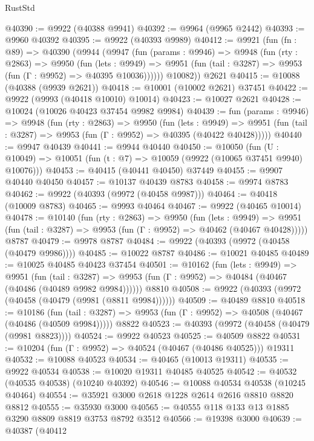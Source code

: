 \begin{lexlean}{RustStd}
\begin{coremodule}
@40390 := @9922 (@40388 @9941)
@40392 := @9964 (@9965 @2442)
@40393 := @9960 @40392
@40395 := @9922 (@40393 @9989)
@40412 := @9921
    (fun (fn : @89) =>
    @40390
      (@9944
        (@9947
          (fun (params : @9946) =>
          @9948
            (fun (rty : @2863) =>
            @9950
              (fun (lets : @9949) =>
              @9951 (fun (tail : @3287) => @9953 (fun (Γ : @9952) => @40395 @10036))))))
        @10082))
    @2621
@40415 := @10088 (@40388 (@9939 @2621))
@40418 := @10001 (@10002 @2621) @37451
@40422 := @9922 (@9993 (@40418 @10010) @10014)
@40423 := @10027 @2621
@40428 := @10024 (@10026 @40423 @37454 @9982 @9984)
@40439 := fun (params : @9946) =>
  @9948
    (fun (rty : @2863) =>
    @9950
      (fun (lets : @9949) =>
      @9951 (fun (tail : @3287) => @9953 (fun (Γ : @9952) => @40395 (@40422 @40428)))))
@40440 := @9947 @40439
@40441 := @9944 @40440
@40450 := @10050
    (fun (U : @10049) => @10051 (fun (t : @7) => @10059 (@9922 (@10065 @37451 @9940) @10076)))
@40453 := @40415 (@40441 @40450) @37449
@40455 := @9907 @40440 @40450
@40457 := @10137 @40439 @8783
@40458 := @9974 @8783
@40462 := @9922 (@40393 (@9972 (@40458 @9987)))
@40464 := @40418 (@10009 @8783)
@40465 := @9993 @40464
@40467 := @9922 (@40465 @10014)
@40478 := @10140
    (fun (rty : @2863) =>
    @9950
      (fun (lets : @9949) =>
      @9951 (fun (tail : @3287) => @9953 (fun (Γ : @9952) => @40462 (@40467 @40428)))))
    @8787
@40479 := @9978 @8787
@40484 := @9922 (@40393 (@9972 (@40458 (@40479 @9986))))
@40485 := @10022 @8787
@40486 := @10021 @40485
@40489 := @10025 @40485 @40423 @37454
@40501 := @10162
    (fun (lets : @9949) =>
    @9951
      (fun (tail : @3287) =>
      @9953 (fun (Γ : @9952) => @40484 (@40467 (@40486 (@40489 @9982 @9984))))))
    @8810
@40508 := @9922 (@40393 (@9972 (@40458 (@40479 (@9981 (@8811 @9984))))))
@40509 := @40489 @8810
@40518 := @10186
    (fun (tail : @3287) => @9953 (fun (Γ : @9952) => @40508 (@40467 (@40486 (@40509 @9984)))))
    @8822
@40523 := @40393 (@9972 (@40458 (@40479 (@9981 @8823))))
@40524 := @9922 @40523
@40525 := @40509 @8822
@40531 := @10204 (fun (Γ : @9952) => @40524 (@40467 (@40486 @40525))) @19311
@40532 := @10088 @40523
@40534 := @40465 (@10013 @19311)
@40535 := @9922 @40534
@40538 := @10020 @19311 @40485 @40525
@40542 := @40532 (@40535 @40538) (@10240 @40392)
@40546 := @10088 @40534 @40538 (@10245 @40464)
@40554 := @35921 @3000 @2618 @1228 @2614 @2616 @8810 @8820 @8812
@40555 := @35930 @3000
@40565 := @40555 @118 @133 @13 @1885 @3290 @8809 @8819 @3753 @8792 @3512
@40566 := @19398 @3000
@40639 := @40387
    (@40412

\end{coremodule}
\end{lexlean}
